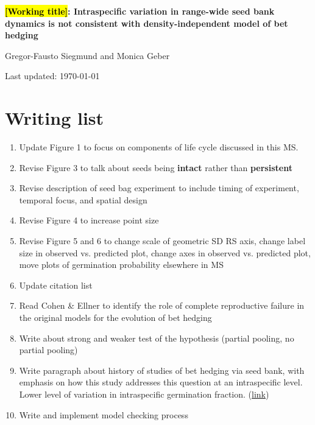 \documentclass[12pt, oneside, titlepage]{article}   	%
\begin{document}
\begin{titlepage}
   \begin{center}
       \vspace*{1cm}
 
       \textbf{\hl{[Working title]}: Intraspecific variation in range-wide seed bank dynamics is not consistent with density-independent model of bet hedging}
 
       \vspace{1.5cm}
 
       Gregor-Fausto Siegmund and Monica Geber
 
   	Last updated: \today
	
	
	\section*{Writing list}
	
	\begin{enumerate}
	
	\item Update Figure 1 to focus on components of life cycle discussed in this MS.
	\item Revise Figure 3 to talk about seeds being \textbf{intact} rather than \textbf{persistent}
	\item Revise description of seed bag experiment to include timing of experiment, temporal focus, and spatial design
	\item Revise Figure 4 to increase point size 
	\item Revise Figure 5 and 6 to change scale of geometric SD RS axis, change label size in observed vs. predicted plot, change axes in observed vs. predicted plot, move plots of germination probability elsewhere in MS
	\item Update citation list
	\item Read Cohen \& Ellner to identify the role of complete reproductive failure in the original models for the evolution of bet hedging
	\item Write about strong and weaker test of the hypothesis (partial pooling, no partial pooling) 
	\item Write paragraph about history of studies of bet hedging via seed bank, with emphasis on how this study addresses this question at an intraspecific level. Lower level of variation in intraspecific germination fraction. (\hyperlink{bet-hedging-history}{link})
	\item Write and implement model checking process
	
	\end{enumerate}
	
 
   \end{center}
\end{titlepage}
%
\end{document}
